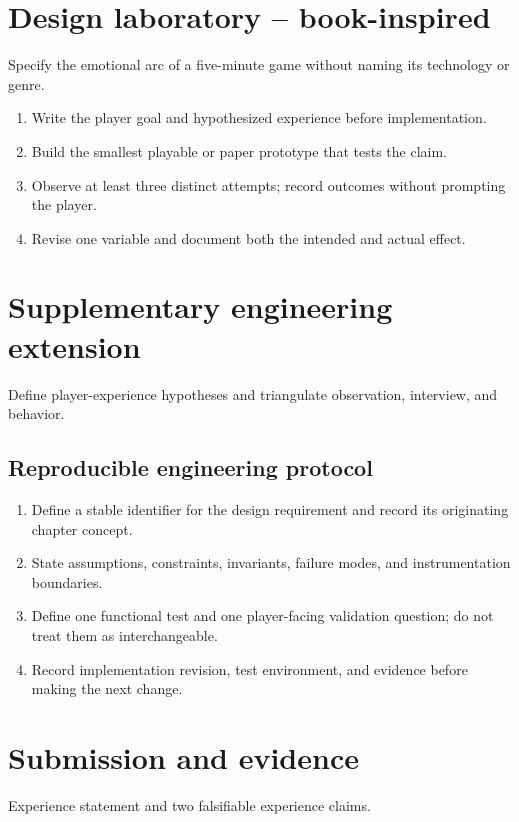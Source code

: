 \documentclass[11pt]{article}
\begin{document}
\section{Design laboratory -- book-inspired}
Specify the emotional arc of a five-minute game without naming its technology or genre.

\begin{enumerate}
\item Write the player goal and hypothesized experience before implementation.
\item Build the smallest playable or paper prototype that tests the claim.
\item Observe at least three distinct attempts; record outcomes without prompting the player.
\item Revise one variable and document both the intended and actual effect.
\end{enumerate}

\section{Supplementary engineering extension}
Define player-experience hypotheses and triangulate observation, interview, and behavior.


\subsection{Reproducible engineering protocol}
\begin{enumerate}
\item Define a stable identifier for the design requirement and record its originating chapter concept.
\item State assumptions, constraints, invariants, failure modes, and instrumentation boundaries.
\item Define one functional test and one player-facing validation question; do not treat them as interchangeable.
\item Record implementation revision, test environment, and evidence before making the next change.
\end{enumerate}

\section{Submission and evidence}
Experience statement and two falsifiable experience claims.
\end{document}
